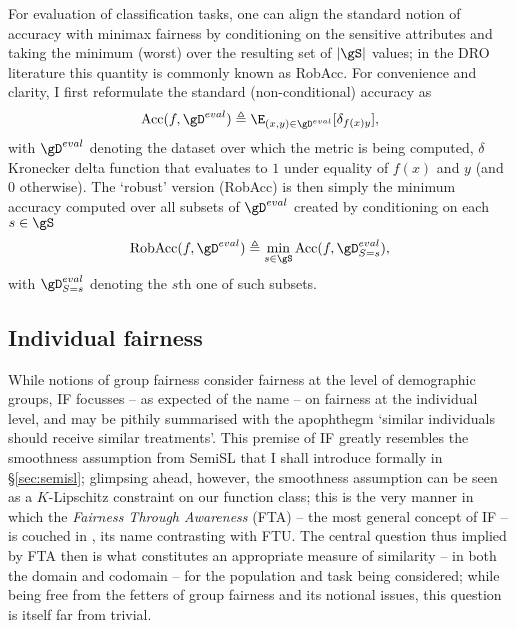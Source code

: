 %
For evaluation of classification tasks, one can align the standard notion of accuracy with minimax
fairness by conditioning on the sensitive attributes and taking the minimum (worst) over the
resulting set of \(|\gS|\) values; in the \ac{DRO} literature this quantity is commonly known as
\ac{RobAcc}.
%
For convenience and clarity, I first reformulate the standard (non-conditional) accuracy as 
%
\begin{equation}
    \text{Acc}(f, \gD^{eval}) \triangleq 
    \E_{ (x, y) \in \gD^{eval}}[ \delta_{f(x)y} ],
 \end{equation}
%
with \( \gD^{eval} \) denoting the dataset over which the metric is being computed, \( \delta
\) Kronecker delta function that evaluates to \(1\) under equality of \(f(x)\) and \(y\) (and \(0\)
otherwise).
%
The `robust' version (\acs{RobAcc}) is then simply the minimum accuracy computed over all subsets of \(
\gD^{eval} \) created by conditioning on each \(s \in \gS \)
%
\begin{equation}
    \text{RobAcc}(f, \gD^{eval}) \triangleq 
    \underset{s \in \gS}{\text{min}} \, \text{Acc}(f, \gD^{eval}_{S=s}),
 \end{equation}
%
 with \( \gD^{eval}_{S=s} \) denoting the \(s\)th one of such subsets.
%
 \subsection{Individual fairness}\label{ssec:if}
While notions of group fairness consider fairness at the level of demographic groups, \ac{IF}
focusses -- as expected of the name -- on fairness at the individual level, and may be pithily
summarised with the apophthegm `similar individuals should receive similar treatments'.
%
This premise of \ac{IF} greatly resembles the smoothness assumption from \ac{SemiSL} that I shall
introduce formally in \S\ref{sec:semisl}; glimpsing ahead, however, the smoothness assumption can
be seen as a \(K\)-Lipschitz constraint on our function class; this is the very manner in which the
\emph{Fairness Through Awareness} (FTA) -- the most general concept of \ac{IF} -- is couched in
\citet{dwork2012fairness}, its name contrasting with FTU.
%
The central question thus implied by FTA then is what constitutes an appropriate measure of
similarity -- in both the domain and codomain -- for the population and task being considered;
while being free from the fetters of group fairness and its notional issues, this question is
itself far from trivial.
%
